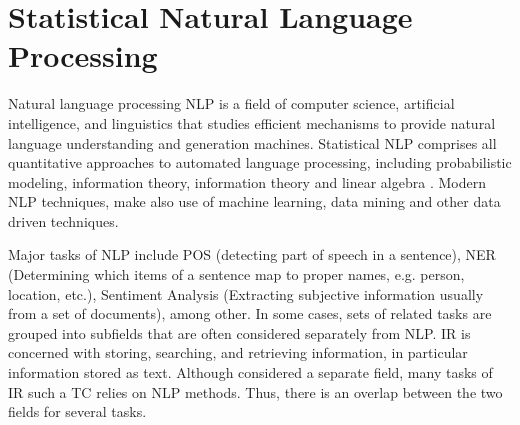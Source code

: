 

     

\section{Statistical Natural Language Processing}
\label{sec:rel_nlp}
Natural language processing \ac{NLP} is a field of computer science,
artificial intelligence, and linguistics that studies efficient mechanisms to
provide natural language understanding and generation  machines. 
Statistical \ac{NLP} comprises all quantitative approaches to automated
language processing, including probabilistic modeling, information theory,
information theory and linear algebra \cite{Manning:1999:FSN:311445}.  Modern
\ac{NLP}  techniques,  make also use of  machine learning, data mining  and other data
driven techniques.

Major tasks of \ac{NLP} include  \ac{POS} (detecting part of speech in a
sentence), \ac{NER}  (Determining which items of a sentence map to proper
names, e.g. person, location, etc.),   Sentiment Analysis (Extracting
subjective information usually from a set of documents), among other. 
In some cases, sets of related tasks are grouped into subfields that are often
considered separately from \ac{NLP}. \ac{IR} is concerned with storing,
searching, and retrieving information, in particular  information stored as
text. Although considered a separate field, many tasks of \ac{IR} such a
\ac{TC} relies on \ac{NLP} methods. Thus, there is an overlap between the two
fields for several tasks.




